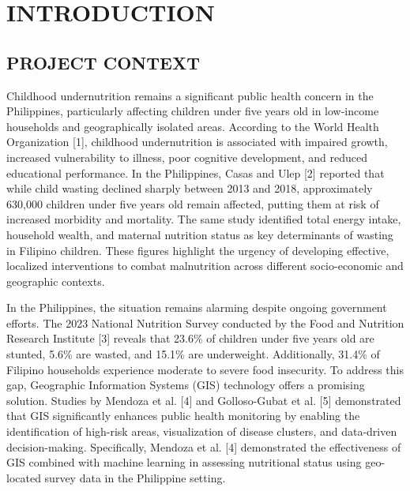 \documentclass[12pt, a4paper]{report}
\begin{document}
\renewcommand{\listtablename}{LIST OF TABLES}
\listoftables
\clearpage


\chapter{INTRODUCTION}
\label{chap:intro}

\section{PROJECT CONTEXT}
\label{sec:project_context}
Childhood undernutrition remains a significant public health concern in the Philippines, particularly affecting children under five years old in low-income households and geographically isolated areas. According to the World Health Organization [1], childhood undernutrition is associated with impaired growth, increased vulnerability to illness, poor cognitive development, and reduced educational performance. In the Philippines, Casas and Ulep [2] reported that while child wasting declined sharply between 2013 and 2018, approximately 630,000 children under five years old remain affected, putting them at risk of increased morbidity and mortality. The same study identified total energy intake, household wealth, and maternal nutrition status as key determinants of wasting in Filipino children. These figures highlight the urgency of developing effective, localized interventions to combat malnutrition across different socio-economic and geographic contexts.

In the Philippines, the situation remains alarming despite ongoing government efforts. The 2023 National Nutrition Survey conducted by the Food and Nutrition Research Institute [3] reveals that 23.6\% of children under five years old are stunted, 5.6\% are wasted, and 15.1\% are underweight. Additionally, 31.4\% of Filipino households experience moderate to severe food insecurity. To address this gap, Geographic Information Systems (GIS) technology offers a promising solution. Studies by Mendoza et al. [4] and Golloso-Gubat et al. [5] demonstrated that GIS significantly enhances public health monitoring by enabling the identification of high-risk areas, visualization of disease clusters, and data-driven decision-making. Specifically, Mendoza et al. [4] demonstrated the effectiveness of GIS combined with machine learning in assessing nutritional status using geo-located survey data in the Philippine setting.
\end{document}
